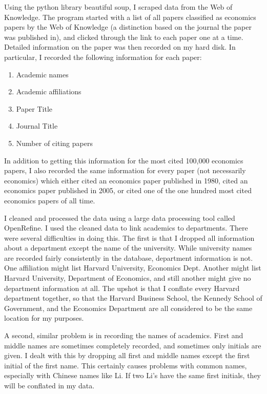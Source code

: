 \documentclass[]{article}
\begin{document}
Using the python library beautiful soup, I scraped data from the Web of
Knowledge. The program started with a list of all papers classified as
economics papers by the Web of Knowledge (a distinction based on the
journal the paper was published in), and clicked through the link to
each paper one at a time. Detailed information on the paper was then
recorded on my hard disk. In particular, I recorded the following
information for each paper:

\begin{enumerate}
\def\labelenumi{\arabic{enumi}.}
\itemsep1pt\parskip0pt
\item
  Academic names
\item
  Academic affiliations
\item
  Paper Title
\item
  Journal Title
\item
  Number of citing papers
\end{enumerate}

In addition to getting this information for the most cited 100,000
economics papers, I also recorded the same information for every paper
(not necessarily economics) which either cited an economics paper
published in 1980, cited an economics paper published in 2005, or cited
one of the one hundred most cited economics papers of all time.

I cleaned and processed the data using a large data processing tool
called OpenRefine. I used the cleaned data to link academics to
departments. There were several difficulties in doing this. The first is
that I dropped all information about a department except the name of the
university. While university names are recorded fairly consistently in
the database, department information is not. One affiliation might list
Harvard University, Economics Dept. Another might list Harvard
University, Department of Economics, and still another might give no
department information at all. The upshot is that I conflate every
Harvard department together, so that the Harvard Business School, the
Kennedy School of Government, and the Economics Department are all
considered to be the same location for my purposes.

A second, similar problem is in recording the names of academics. First
and middle names are sometimes completely recorded, and sometimes only
initials are given. I dealt with this by dropping all first and middle
names except the first initial of the first name. This certainly causes
problems with common names, especially with Chinese names like Li. If
two Li's have the same first initials, they will be conflated in my
data.
\end{document}
